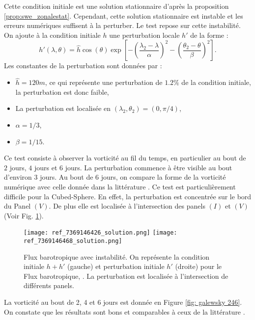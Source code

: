 Cette condition initiale est une solution stationnaire d'après la proposition \ref{prop:swe_zonalestat}. Cependant, cette solution stationnaire est instable et les erreurs numériques suffisent à la perturber. Le test repose sur cette instabilité. On ajoute à la condition initiale $h$ une perturbation locale $h'$ de la forme :
\begin{equation}
h'(\lambda, \theta) = \hat{h} \cos ( \theta ) \exp \left[ - \left( \dfrac{\lambda_2 - \lambda}{\alpha} \right)^2 - \left( \dfrac{\theta_2 - \theta}{\beta} \right)^2 \right].
\end{equation}
Les constantes de la perturbation sont données par :
\begin{itemize}
\item $\hat{h} = 120 \si{m}$, ce qui représente une perturbation de $1.2 \%$ de la condition initiale, la perturbation est donc faible,
\item La perturbation est localisée en $(\lambda_2, \theta_2) = (0, \pi/4)$,
\item $\alpha = 1/3$,
\item $\beta = 1/15$.
\end{itemize}

Ce test consiste à observer la vorticité au fil du temps, en particulier au bout de $2$ jours, $4$ jours et $6$ jours. La perturbation commence à être visible au bout d'environ 3 jours. Au bout de 6 jours, on compare la forme de la vorticité numérique avec celle donnée dans la littérature \cite{Galewsky2004, Chen2008}. Ce test est particulièrement difficile pour la Cubed-Sphere. En effet, la perturbation est concentrée sur le bord du Panel $(V)$. De plus elle est localisée à l'intersection des panels $(I)$ et $(V)$ (Voir Fig. \ref{fig: initiale et perturbation Galewsky}).

\begin{figure}[htbp]
\begin{center}
\texttt{[image: ref\_7369146426\_solution.png]}
\texttt{[image: ref\_7369146468\_solution.png]}
\end{center}
\caption{Flux barotropique avec instabilité. On représente la condition initiale $h+h'$ (gauche) et perturbation initiale $h'$ (droite) pour le Flux barotropique, \cite{Galewsky2004}. La perturbation est localisée à l'intersection de différents panels.}
\label{fig: initiale et perturbation Galewsky}
\end{figure}

La vorticité au bout de 2, 4 et 6 jours est donnée en Figure \ref{fig: galewsky 246}. On constate que les résultats sont bons et comparables à ceux de la littérature \cite{Chen2008, Galewsky2004, Nair2005}. 

